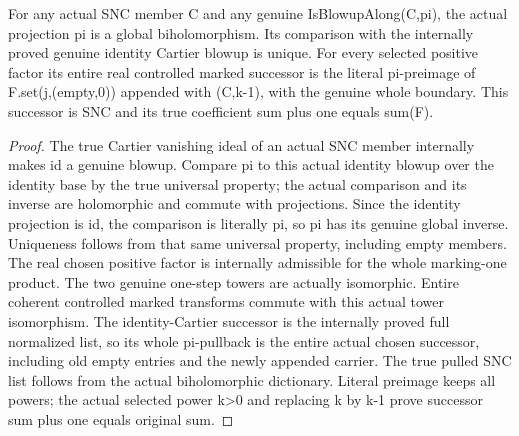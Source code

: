 \begin{lemma}
\label{hir:nc-ordered-choice-actual-cartier-inverse}
\leanok
For any actual SNC member C and any genuine IsBlowupAlong(C,pi), the actual
projection pi is a global biholomorphism. Its comparison with the internally
proved genuine identity Cartier blowup is unique. For every selected positive
factor its entire real controlled marked successor is the literal pi-preimage
of F.set(j,(empty,0)) appended with (C,k-1), with the genuine whole boundary.
This successor is SNC and its true coefficient sum plus one equals sum(F).
\end{lemma}
\begin{proof}
The true Cartier vanishing ideal of an actual SNC member internally makes
id a genuine blowup. Compare pi to this actual identity blowup over the
identity base by the true universal property; the actual comparison and its
inverse are holomorphic and commute with projections. Since the identity
projection is id, the comparison is literally pi, so pi has its genuine global
inverse. Uniqueness follows from that same universal property, including empty
members. The real chosen positive factor is internally admissible for the
whole marking-one product. The two genuine one-step towers are actually
isomorphic. Entire coherent controlled marked transforms commute with this
actual tower isomorphism. The identity-Cartier successor is the internally
proved full normalized list, so its whole pi-pullback is the entire actual
chosen successor, including old empty entries and the newly appended carrier.
The true pulled SNC list follows from the actual biholomorphic dictionary.
Literal preimage keeps all powers; the actual selected power k>0 and replacing
k by k-1 prove successor sum plus one equals original sum.
\end{proof}

